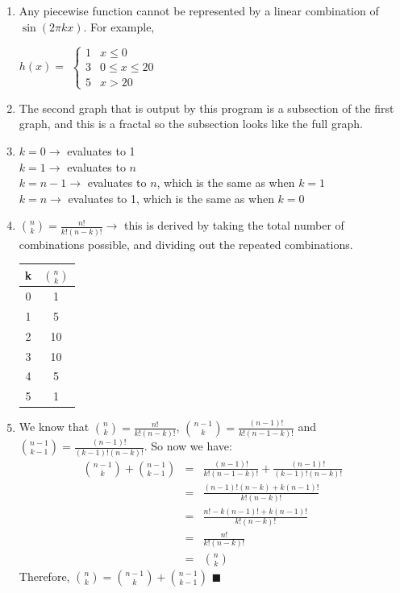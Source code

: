\documentclass{article}
\newcommand*{\qed}{\hfill\ensuremath{\blacksquare}}
\begin{document}
\begin{enumerate}
\item Any piecewise function cannot be represented by a linear combination of $\sin{(2\pi kx)}$. For example, 

$ h(x) = $
$ \begin{cases} 
      1 & x\leq 0 \\
      3& 0\leq x\leq 20 \\
      5 & x > 20
   \end{cases}
$

\item The second graph that is output by this program is a subsection of the first graph, and this is a fractal so the subsection looks like the full graph.

\item $k=0 \rightarrow$ evaluates to 1\\
$k=1 \rightarrow$ evaluates to $n$\\
$k=n-1 \rightarrow$ evaluates to $n$, which is the same as when $k=1$\\
$k=n \rightarrow$ evaluates to 1, which is the same as when $k=0$

\item ${n\choose k} = \frac{n!}{k! (n-k)!} \rightarrow$ this is derived by taking the total number of combinations possible, and dividing out the repeated combinations.\\
\begin{tabular}{|c|c|}
	\hline
	k	& ${n\choose k}$\\
	\hline
	0	& 1\\
	\hline
	1	& 5\\
	\hline
	2	& 10\\
	\hline
	3	& 10\\
	\hline
	4	& 5\\
	\hline
	5	& 1\\
	\hline
\end{tabular}

\item We know that ${n\choose k} = \frac{n!}{k!(n-k)!}$, ${n-1\choose k} = \frac{(n-1)!}{k!(n-1-k)!}$ and ${n-1\choose k-1} = \frac{(n-1)!}{(k-1)!(n-k)!}$. So now we have:
\begin{eqnarray*}
	{n-1\choose k} + {n-1\choose k-1} &=& \frac{(n-1)!}{k!(n-1-k)!} + \frac{(n-1)!}{(k-1)!(n-k)!}\\
	&=& \frac{(n-1)!(n-k) + k(n-1)!}{k!(n-k)!}\\
	&=& \frac{n! - k(n-1)! + k(n-1)!}{k!(n-k)!}\\
	&=& \frac{n!}{k!(n-k)!}\\
	&=& {n\choose k} 
\end{eqnarray*} 
Therefore, ${n\choose k} = {n-1\choose k} + {n-1\choose k-1}$ \qed


\end{enumerate}
\end{document}
